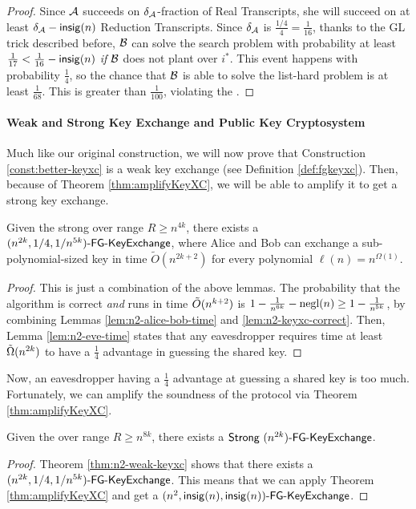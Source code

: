 \begin{proof}
	Since $\cA$ succeeds on $\delta_{\cA}$-fraction of Real Transcripts, she will succeed on at least $\delta_{\cA} - \insig(n)$ Reduction Transcripts. Since $\delta_{\cA}$ is $\frac{1/4}{4} = \frac{1}{16}$, thanks to the GL trick described before, $\cB$ can solve the search problem with probability at least $\frac{1}{17} < \frac{1}{16} - \insig(n)$ \emph{if} $\cB$ does not plant over $i^*$. This event happens with probability $\frac{1}{4}$, so the chance that $\cB$ is able to solve the list-hard problem is at least $\frac{1}{68}$.
	This is greater than $\frac{1}{100}$, violating the \strongzkc.
\end{proof}

\paragraph{Weak and Strong Key Exchange and Public Key Cryptosystem}
Much like our original construction, we will now prove that Construction \ref{const:better-keyxc} is a weak key exchange (see Definition \ref{def:fgkeyxc}). Then, because of Theorem \ref{thm:amplifyKeyXC}, we will be able to amplify it to get a strong key exchange.

\begin{theorem}\label{thm:n2-weak-keyxc}
	Given the strong \zkclique over range $R \ge n^{4k}$, there exists a
	$\fgkeyxc{n^{2k}}{1/4}{1/n^{5k}}$, where Alice and Bob can exchange a sub-polynomial-sized key in time $\tilde{O}\left(n^{2k + 2}\right)$ for every polynomial $\ell(n)= n^{\Omega(1)}$.
\end{theorem}
\begin{proof}
	This is just a combination of the above lemmas. The probability that the algorithm is correct \emph{and} runs in time $\~O(n^{k+2})$ is $1 - \frac{1}{n^{6k}} - \negl(n) \ge 1 - \frac{1}{n^{5k}}$, by combining Lemmas \ref{lem:n2-alice-bob-time} and \ref{lem:n2-keyxc-correct}. Then, Lemma \ref{lem:n2-eve-time} states that any eavesdropper requires time at least $\~\Omega(n^{2k})$ to have a $\frac 1 4$ advantage in guessing the shared key.
\end{proof}

Now, an eavesdropper having a $\frac 1 4$ advantage at guessing a shared key is too much. Fortunately, we can amplify the soundness of the protocol via Theorem \ref{thm:amplifyKeyXC}.

\begin{corollary}
	Given the \strongzkc over range $R \ge n^{8k}$, there exists a
	$\strongfgkeyxc{n^{2k}}$.
\end{corollary}
\begin{proof}
	Theorem \ref{thm:n2-weak-keyxc} shows that there exists a $\fgkeyxc{n^{2k}}{1/4}{1/n^{5k}}$. This means that we can apply Theorem \ref{thm:amplifyKeyXC} and get a $\fgkeyxc{n^2}{\insig(n)}{\insig(n)}$.
\end{proof}

